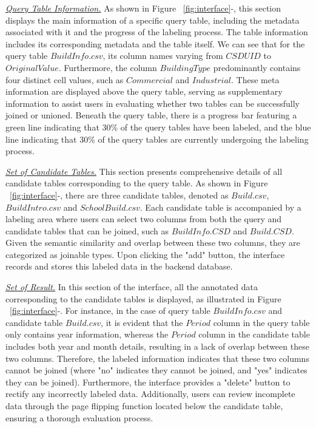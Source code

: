 \noindent \underline{\textit{Query Table Information.}}  
As shown in Figure ~\ref{fig:interface}-, this section 
displays the main information of a specific query table, including the metadata associated with it and the progress of the labeling process. The table information  includes its corresponding metadata and the table itself. We can see that for the query table $BuildInfo.csv$, its column names varying from $CSDUID$ to $OriginalValue$. Furthermore, the column $Building Type$ predominantly contains four distinct cell values, such as $Commercial$ and $Industrial$. These meta information are displayed above the query table, serving as supplementary information to assist users in  evaluating whether two tables can be successfully joined or unioned. Beneath the query table, there is a progress bar featuring a green line indicating that 30\% of the query tables have been labeled, and the blue line indicating that 30\% of the query tables are currently undergoing the labeling process.

\noindent \underline{\textit{Set of Candidate Tables.}} This section presents comprehensive details of all candidate tables corresponding to the query table. As shown in Figure ~\ref{fig:interface}-, there are three candidate tables, denoted as $Build.csv$, $BuildIntro.csv$ and $SchoolBuild.csv$. Each candidate table is accompanied by a labeling area where users can select two columns from both the query and candidate tables that can be joined, such as $BuildInfo.CSD$ and $Build.CSD$. Given the semantic similarity and overlap between these two columns, they are categorized as joinable types. Upon clicking the "add" button, the interface records and stores this labeled data in the backend database.

\noindent \underline{\textit{Set of Result.}} In this section of the interface, all the annotated data corresponding to the candidate tables is displayed, as illustrated in Figure ~\ref{fig:interface}-. For instance, in the case of query table $BuildInfo.csv$ and candidate table $Build.csv$, it is evident that the $Period$ column in the query table only contains year information, whereas the  $Period$ column in the candidate table includes both year and month details, resulting in a lack of overlap between these two columns. Therefore, the labeled information indicates that these two columns cannot be joined (where "no" indicates they cannot be joined, and "yes" indicates they can be joined).
Furthermore, the interface provides a "delete" button to rectify any incorrectly labeled data. Additionally, users can review incomplete data through the page flipping function located below the candidate table, ensuring a thorough evaluation process.




